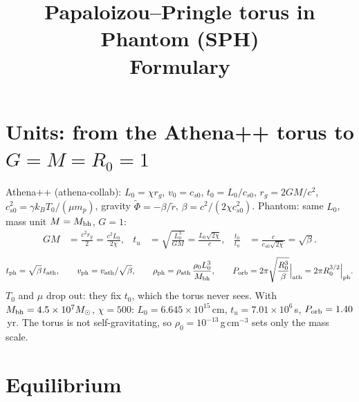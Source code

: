 \documentclass[10pt,a4paper]{article}
\title{Papaloizou--Pringle torus in Phantom (SPH)\\[2pt]\large Formulary}
\date{}
\begin{document}
\maketitle
\vspace{-3.5em}

\section{Units: from the Athena++ torus to $G=M=R_0=1$}

Athena++ (athena-collab): $L_0=\chi r_g$, $v_0=c_{s0}$, $t_0=L_0/c_{s0}$,
$r_g=2GM/c^2$, $c_{s0}^2=\gamma k_BT_0/(\mu m_p)$, gravity $\tilde\Phi=-\beta/\tilde r$,
$\beta=c^2/(2\chi c_{s0}^2)$.
Phantom: same $L_0$, mass unit $M=M_{\rm bh}$, $G=1$:
\begin{align*}
GM&=\frac{c^2r_g}{2}=\frac{c^2L_0}{2\chi},&
t_u&=\sqrt{\frac{L_0^3}{GM}}=\frac{L_0\sqrt{2\chi}}{c},&
\frac{t_0}{t_u}&=\frac{c}{c_{s0}\sqrt{2\chi}}=\sqrt\beta .
\end{align*}
\begin{equation}
t_{\rm ph}=\sqrt\beta\,t_{\rm ath},\qquad v_{\rm ph}=v_{\rm ath}/\sqrt\beta,\qquad
\rho_{\rm ph}=\rho_{\rm ath}\,\frac{\rho_0L_0^3}{M_{\rm bh}},\qquad
P_{\rm orb}=2\pi\sqrt{\frac{R_0^3}{\beta}}\Big|_{\rm ath}=2\pi R_0^{3/2}\Big|_{\rm ph}.
\end{equation}
$T_0$ and $\mu$ drop out: they fix $t_0$, which the torus never sees. With
$M_{\rm bh}=4.5\times10^7M_\odot$, $\chi=500$: $L_0=6.645\times10^{15}$\,cm,
$t_u=7.01\times10^6$\,s, $P_{\rm orb}=1.40$\,yr. The torus is not self-gravitating, so
$\rho_0=10^{-13}$\,g\,cm$^{-3}$ sets only the mass scale.

\section{Equilibrium}
\end{document}
